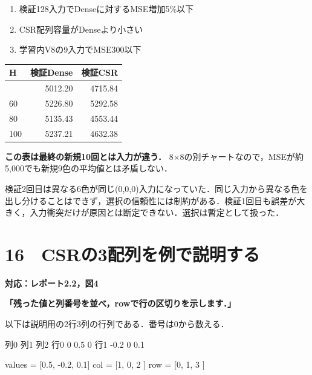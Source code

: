\documentclass[
  14pt,
  a5paper,
]{extarticle}
\newenvironment{Shaded}{}{}
\newcommand{\NormalTok}[1]{#1}
\providecommand{\tightlist}{%
  \setlength{\itemsep}{0pt}\setlength{\parskip}{0pt}}
\begin{document}
\begin{enumerate}
\def\labelenumi{\arabic{enumi}.}
\tightlist
\item
  検証128入力でDenseに対するMSE増加5\%以下
\item
  CSR配列容量がDenseより小さい
\item
  学習内V8の9入力でMSE300以下
\end{enumerate}

\begin{longtable}[]{@{}lrr@{}}
\toprule\noalign{}
H & 検証Dense & 検証CSR \\
\midrule\noalign{}
\endhead
\bottomrule\noalign{}
\endlastfoot
40 & 5012.20 & 4715.84 \\
60 & 5226.80 & 5292.58 \\
80 & 5135.43 & 4553.44 \\
100 & 5237.21 & 4632.38 \\
\end{longtable}

\textbf{この表は最終の新規10回とは入力が違う．}
8×8の別チャートなので，MSEが約5,000でも新規9色の平均値とは矛盾しない．

検証2回目は異なる6色が同じ(0,0,0)入力になっていた．同じ入力から異なる色を出し分けることはできず，選択の信頼性には制約がある．検証1回目も誤差が大きく，入力衝突だけが原因とは断定できない．選択は暫定として扱った．

\newpage

\section{16　CSRの3配列を例で説明する}\label{csrux306e3ux914dux5217ux3092ux4f8bux3067ux8aacux660eux3059ux308b}

\textbf{対応：レポート2.2，図4}

\textbf{「残った値と列番号を並べ，rowで行の区切りを示します．」}

以下は説明用の2行3列の行列である．番号は0から数える．

\begin{Shaded}
\begin{Highlighting}[]
\NormalTok{        列0   列1  列2}
\NormalTok{行0      0    0.5   0}
\NormalTok{行1    {-}0.2    0   0.1}

\NormalTok{values = [0.5, {-}0.2, 0.1]}
\NormalTok{col    = [1,    0,   2  ]}
\NormalTok{row    = [0,    1,   3  ]}
\end{Highlighting}
\end{Shaded}
\end{document}
